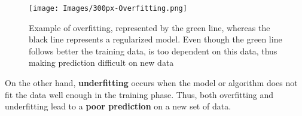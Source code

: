\begin{figure}[h!]
    \centering
    \texttt{[image: Images/300px-Overfitting.png]}
    \caption[Example of overfitting]{Example of overfitting, represented by the green line, whereas the black line represents a regularized model. Even though the green line follows better the training data, is too dependent on this data, thus making prediction difficult on new data \protect\footnotemark}
    \label{fig:ex_overfit}
\end{figure} \par


On the other hand, \textbf{underfitting} occurs when the model or algorithm does not fit the data well enough in the training phase. Thus, both overfitting and underfitting lead to a \textbf{poor prediction} on a new set of data.